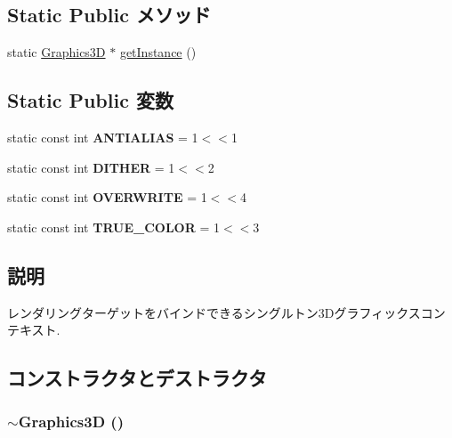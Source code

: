 \subsection*{Static Public メソッド}
\begin{CompactItemize}
\item 
static \hyperlink{classm3g_1_1Graphics3D}{Graphics3D} $\ast$ \hyperlink{classm3g_1_1Graphics3D_da6d71754bfe755dd8204a9332e9ed47}{getInstance} ()
\end{CompactItemize}
\subsection*{Static Public 変数}
\begin{CompactItemize}
\item 
\hypertarget{classm3g_1_1Graphics3D_9df12c5332904e66a962e1bf2809a812}{
static const int \textbf{ANTIALIAS} = 1$<$$<$1}
\label{classm3g_1_1Graphics3D_9df12c5332904e66a962e1bf2809a812}

\item 
\hypertarget{classm3g_1_1Graphics3D_3750f57b82328be988bdab3b672a64f9}{
static const int \textbf{DITHER} = 1$<$$<$2}
\label{classm3g_1_1Graphics3D_3750f57b82328be988bdab3b672a64f9}

\item 
\hypertarget{classm3g_1_1Graphics3D_f448f7f447a301823af9170bfe84c50e}{
static const int \textbf{OVERWRITE} = 1$<$$<$4}
\label{classm3g_1_1Graphics3D_f448f7f447a301823af9170bfe84c50e}

\item 
\hypertarget{classm3g_1_1Graphics3D_bbd22a6baea672f895d5ef32e2438ec6}{
static const int \textbf{TRUE\_\-COLOR} = 1$<$$<$3}
\label{classm3g_1_1Graphics3D_bbd22a6baea672f895d5ef32e2438ec6}

\end{CompactItemize}


\subsection{説明}
レンダリングターゲットをバインドできるシングルトン3Dグラフィックスコンテキスト. 

\subsection{コンストラクタとデストラクタ}
\hypertarget{classm3g_1_1Graphics3D_9b9347476fc10e57b31694ac8a628511}{
\subsubsection[{$\sim$Graphics3D}]{\setlength{\rightskip}{0pt plus 5cm}$\sim${\bf Graphics3D} ()}}
\label{classm3g_1_1Graphics3D_9b9347476fc10e57b31694ac8a628511}


